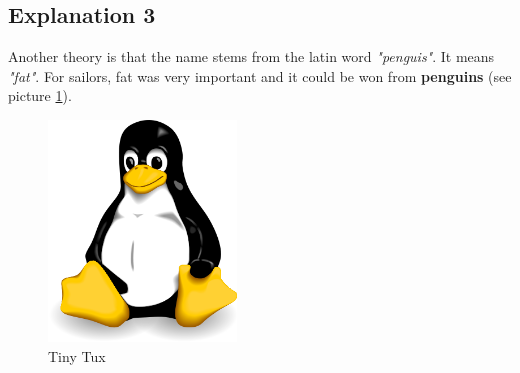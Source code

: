 \documentclass[a4paper, pdftex, english, 11pt]{article}
\begin{document}
\newpage
\subsection{Explanation 3}
Another theory is that the name stems from the latin word \emph{"penguis"}. It means \emph{"fat"}. For sailors, fat was very important and it could be won from \textbf{penguins} (see picture \ref{img:tux}).

\begin{figure}[H]
\begin{center}
\includegraphics[width=5cm]{bilder/tux.png}
\caption{Tiny Tux}
\label{img:tux}
\end{center}
\end{figure}
\end{document}
